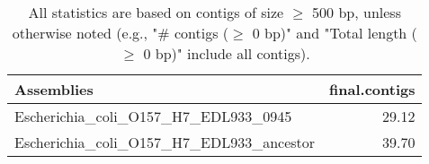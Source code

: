 \documentclass[12pt,a4paper]{article}
\begin{document}
\begin{table}[ht]
\begin{center}
\caption{All statistics are based on contigs of size $\geq$ 500 bp, unless otherwise noted (e.g., "\# contigs ($\geq$ 0 bp)" and "Total length ($\geq$ 0 bp)" include all contigs).}
\begin{tabular}{|l*{1}{|r}|}
\hline
Assemblies & final.contigs \\ \hline
Escherichia\_coli\_O157\_H7\_EDL933\_0945 & 29.12 \\ \hline
Escherichia\_coli\_O157\_H7\_EDL933\_ancestor & 39.70 \\ \hline
\end{tabular}
\end{center}
\end{table}
\end{document}
